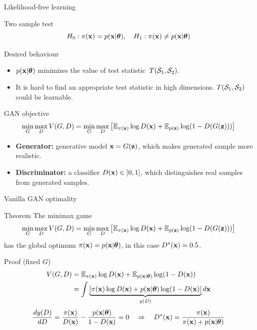 \begin{frame}{Likelihood-free learning}
	\begin{block}{Two sample test}
		\vspace{-0.3cm}
		\[
			H_0: \pi(\mathbf{x}) = p(\mathbf{x} | \boldsymbol{\theta}), \quad H_1: \pi(\mathbf{x}) \neq p(\mathbf{x} | \boldsymbol{\theta})
		\]
		\vspace{-0.6cm}
	\end{block}
	\begin{block}{Desired behaviour}
		\begin{itemize}
			\item $p(\mathbf{x} | \boldsymbol{\theta})$ minimizes the value of test statistic~$T(\mathcal{S}_1, \mathcal{S}_2)$.
			\item It is hard to find an appropriate test statistic in high dimensions. $T(\mathcal{S}_1, \mathcal{S}_2)$ could be learnable.
		\end{itemize}
	\end{block}
	\begin{block}{GAN objective}
		\vspace{-0.5cm}
		\[
			\min_{G} \max_D V(G, D) = \min_{G} \max_D \left[ \mathbb{E}_{\pi(\mathbf{x})} \log D(\mathbf{x}) + \mathbb{E}_{p(\mathbf{z})} \log (1 - D(G(\mathbf{z}))) \right]
		\]
		\vspace{-0.4cm}
	\end{block}
	\begin{itemize}
		\item \textbf{Generator:} generative model $\mathbf{x} = G(\mathbf{z})$, which makes generated sample more realistic.
		\item \textbf{Discriminator:} a classifier $D(\mathbf{x}) \in [0, 1]$, which distinguishes real samples from generated samples.
	\end{itemize}
\end{frame}
\begin{frame}{Vanilla GAN optimality}
	\begin{block}{Theorem}
	The minimax game 
		\vspace{-0.1cm}
		\[
			\min_{G} \max_D V(G, D) = \min_{G} \max_D \left[ \mathbb{E}_{\pi(\mathbf{x})} \log D(\mathbf{x}) + \mathbb{E}_{p(\mathbf{z})} \log (1 - D(G(\mathbf{z}))) \right]
		\]
	has the global optimum $\pi(\mathbf{x}) = p(\mathbf{x} | \boldsymbol{\theta})$, in this case $D^*(\mathbf{x}) = 0.5$.
	\end{block}
	\begin{block}{Proof (fixed $G$)}
		\vspace{-0.5cm}
		\begin{align*}
			V(G, D) &= \mathbb{E}_{\pi(\mathbf{x})} \log D(\mathbf{x}) + \mathbb{E}_{p(\mathbf{x} | \boldsymbol{\theta})} \log (1 - D(\mathbf{x})) \\
			&= \int \underbrace{\left[ \pi(\mathbf{x}) \log D(\mathbf{x}) + p(\mathbf{x} | \boldsymbol{\theta})\log (1 - D(\mathbf{x}) \right]}_{y(D)} d \mathbf{x}
		\end{align*}
		\vspace{-0.2cm}
		\[
			\frac{d y(D)}{d D} = \frac{\pi(\mathbf{x})}{D(\mathbf{x})} - \frac{p(\mathbf{x} | \boldsymbol{\theta})}{1 - D(\mathbf{x})} = 0 \quad \Rightarrow \quad D^*(\mathbf{x}) = \frac{\pi(\mathbf{x})}{\pi(\mathbf{x}) + p(\mathbf{x} | \boldsymbol{\theta})}
		\]
	\end{block}
\end{frame}
